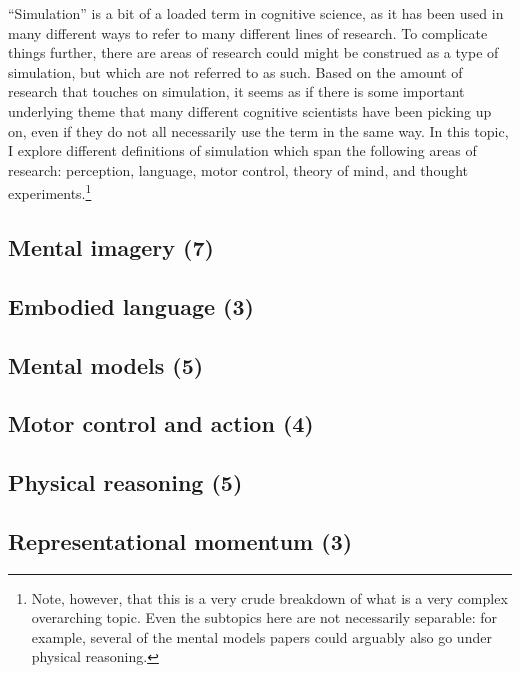 \documentclass{article}
\begin{document}
``Simulation'' is a bit of a loaded term in cognitive science, as it has been used in many different ways to refer to many different lines of research.
To complicate things further, there are areas of research could might be construed as a type of simulation, but which are not referred to as such.
Based on the amount of research that touches on simulation, it seems as if there is some important underlying theme that many different cognitive scientists have been picking up on, even if they do not all necessarily use the term in the same way.
In this topic, I explore different definitions of simulation which span the following areas of research: perception, language, motor control, theory of mind, and thought experiments.\footnote{Note, however, that this is a very crude breakdown of what is a very complex overarching topic.
Even the subtopics here are not necessarily separable: for example, several of the mental models papers could arguably also go under physical reasoning.}


\subsection{Mental imagery (7)}

\subsection{Embodied language (3)}

\subsection{Mental models (5)}

\subsection{Motor control and action (4)}

\subsection{Physical reasoning (5)}

\subsection{Representational momentum (3)}
\end{document}
